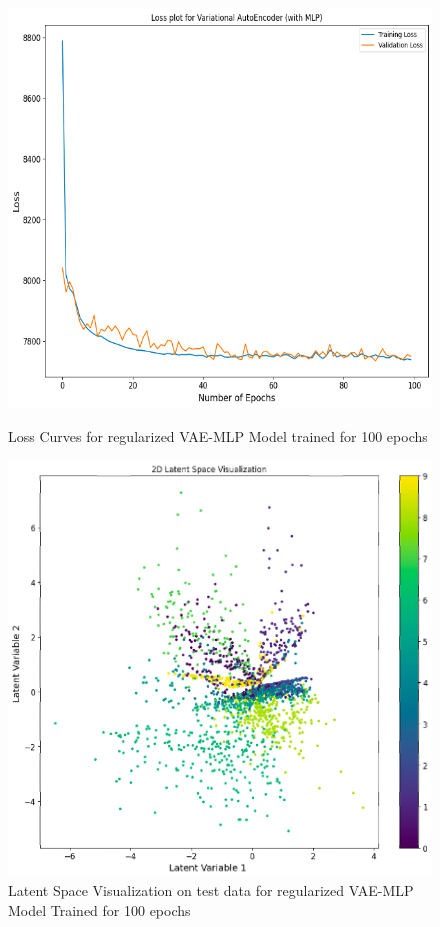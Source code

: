 \documentclass[12pt]{article}
\begin{document}
\begin{figure}[htbp]
    \centering
    \begin{minipage}[b]{0.45\linewidth}
        \centering
        \includegraphics[width=\linewidth]{100r.png}
        \caption{Loss Curves for regularized VAE-MLP Model trained for 100 epochs}
        \label{fig:gen_stft}
    \end{minipage}
    \hfill
    \begin{minipage}[b]{0.45\linewidth}
        \centering
        \includegraphics[width=\linewidth]{latr.png}
        \caption{Latent Space Visualization on test data for regularized VAE-MLP Model Trained for 100 epochs}
        \label{fig:generated_audio}
    \end{minipage}
\end{figure}
\end{document}

